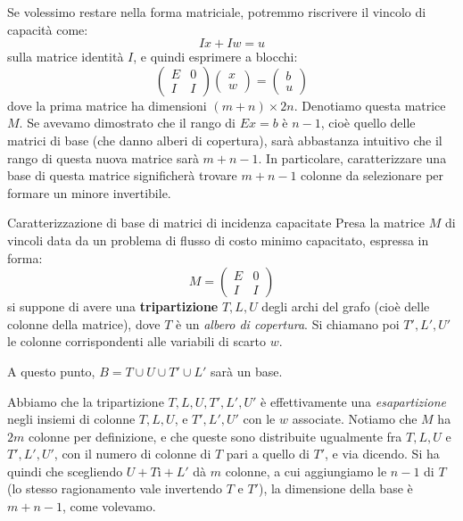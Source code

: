 \documentclass[a4paper,11pt]{article}
\begin{document}
Se volessimo restare nella forma matriciale, potremmo riscrivere il vincolo di capacità come:
$$
Ix + Iw = u
$$
sulla matrice identità $I$, e quindi esprimere a blocchi:
$$
\begin{pmatrix}
	E & 0 \\ 
	I & I
\end{pmatrix}
\begin{pmatrix}
	x \\ w
\end{pmatrix}
=
\begin{pmatrix}
	b \\ u
\end{pmatrix}
$$
dove la prima matrice ha dimensioni $(m + n) \times 2n$.
Denotiamo questa matrice $M$.
Se avevamo dimostrato che il rango di $Ex = b$ è $n - 1$, cioè quello delle matrici di base (che danno alberi di copertura), sarà abbastanza intuitivo che il rango di questa nuova matrice sarà $m + n - 1$.
In particolare, caratterizzare una base di questa matrice significherà trovare $m + n - 1$ colonne da selezionare per formare un minore invertibile.

\begin{theorem}{Caratterizzazione di base di matrici di incidenza capacitate}
	Presa la matrice $M$ di vincoli data da un problema di flusso di costo minimo capacitato, espressa in forma:
$$
M=
\begin{pmatrix}
	E & 0 \\ 
	I & I
\end{pmatrix}
$$
si suppone di avere una \textbf{tripartizione} $T, L, U$ degli archi del grafo (cioè delle colonne della matrice), dove $T$ è un \textit{albero di copertura}. 
Si chiamano poi $T', L', U'$ le colonne corrispondenti alle variabili di scarto $w$.

A questo punto, $B = T \cup U \cup T' \cup L'$ sarà un base. 

\end{theorem}

Abbiamo che la tripartizione $T, L, U, T', L', U'$ è effettivamente una \textit{esapartizione} negli insiemi di colonne $T, L, U$, e $T', L', U'$ con le $w$ associate.
Notiamo che $M$ ha $2m$ colonne per definizione, e che queste sono distribuite ugualmente fra $T, L, U$ e $T', L', U'$, con il numero di colonne di $T$ pari a quello di $T'$, e via dicendo.
Si ha quindi che scegliendo $U + Tì + L'$ dà $m$ colonne, a cui aggiungiamo le $n-1$ di $T$ (lo stesso ragionamento vale invertendo $T$ e $T'$), la dimensione della base è $m + n - 1$, come volevamo.
\end{document}

